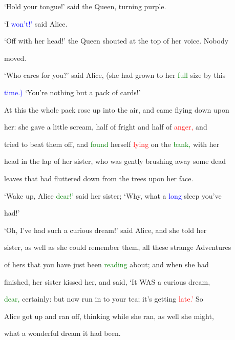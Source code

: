  ‘Hold your tongue!’ said the Queen, turning purple.



 ‘I \textcolor{blue}{won’t!’} said Alice.



 ‘Off with her head!’ the Queen \textcolor{BurntOrange}{shouted} at the \textcolor{BurntOrange}{top} of her voice. Nobody

 moved.



 ‘Who cares for you?’ said Alice, (she had grown to her \textcolor{green}{full} size by this

 \textcolor{blue}{time.)} ‘You’re nothing but a pack of cards!’



 At this the whole pack rose up into the air, and came flying down upon

 her: she gave a little \textcolor{BurntOrange}{scream,} half of \textcolor{BurntOrange}{fright} and half of \textcolor{red}{anger,} and

 tried to beat them off, and \textcolor{green}{found} herself \textcolor{red}{lying} on the \textcolor{green}{bank,} with her

 head in the lap of her sister, who was gently brushing away some dead

 leaves that had fluttered down from the \textcolor{BurntOrange}{trees} upon her face.



 ‘Wake up, Alice \textcolor{green}{dear!’} said her sister; ‘Why, what a \textcolor{blue}{long} sleep you’ve

 had!’



 ‘Oh, I’ve had such a curious dream!’ said Alice, and she told her

 sister, as well as she could remember them, all these strange \textcolor{BurntOrange}{Adventures}

 of hers that you have just been \textcolor{green}{reading} about; and when she had

 finished, her sister \textcolor{BurntOrange}{kissed} her, and said, ‘It WAS a curious dream,

 \textcolor{green}{dear,} certainly: but now run in to your tea; it’s getting \textcolor{red}{late.’} So

 Alice got up and ran off, thinking while she ran, as well she might,

 what a \textcolor{BurntOrange}{wonderful} dream it had been.



